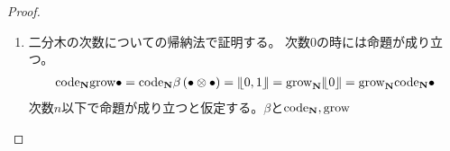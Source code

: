 {\begin{proof}
\begin{enumerate}
			次数$0$の時には命題が成り立つ。
			\begin{equation*}\begin{split}
				\code_\sizen\opN\bullet = \code_\sizen0 = 0 
				= \opN_\sizen\word{0} = \opN_\sizen\code_\sizen\bullet
			\end{split}\end{equation*}
			次数$n$以下で命題が成り立つと仮定する。$\beta$と$\code_\sizen,\opN$
			との交換関係から次の式が成り立つ。
			\begin{equation*}\begin{split}
				\code_\sizen\opN\beta 
				= m_0\plr{1\otimes\opR_+}\plr{\code_\sizen\otimes\code_\sizen}
					\plr{\opN\otimes1 + 1\otimes\opN + 1\otimes1} \\
			\end{split}\end{equation*}
			任意の$r,s\le n$に対して、$\clB_r\otimes\clB_s$に作用させると、
			帰納法の仮定から次の式が成り立ち、
			\begin{equation*}\begin{split}
				& \code_\sizen\opN\beta\plr{\clB_r\otimes\clB_s} \\
				&= m_0\plr{1\otimes\opR_+}\plr{\code_\sizen\otimes\code_\sizen}
					\plr{\opN\otimes1 + 1\otimes\opN + 1\otimes1}
					\plr{\clB_r\otimes\clB_s} \\
				&= m_0\plr{1\otimes\opR_+}
					\plr{\opN_\sizen\otimes1 + 1\otimes\opN_\sizen + 1\otimes1}
					\plr{\code_\sizen\otimes\code_\sizen}
					\plr{\clB_r\otimes\clB_s} \\
				&= m_0\plr{\opN_\sizen\otimes1 + 1\otimes\opN_\sizen}
					\plr{1\otimes\opR_+}
					\plr{\code_\sizen\otimes\code_\sizen}
					\plr{\clB_r\otimes\clB_s} \\
				&= \opN_\sizen\code_\sizen\beta\plr{\clB_r\otimes\clB_s} \\
			\end{split}\end{equation*}
			次数が$n+1$でも命題が成り立つことがわかる。
			\item 二分木の次数についての帰納法で証明する。
			次数$0$の時には命題が成り立つ。
			\begin{equation*}\begin{split}
				{\mathinner{\operatorname{code}}}_{\mathbf{N}}{\mathinner{\operatorname{grow}}}\bullet 
				= {\mathinner{\operatorname{code}}}_{\mathbf{N}}\beta\mathinner{({\bullet\otimes\bullet})} = {|\!\lfloor{0,1}\rfloor\!|}
				= {\mathinner{\operatorname{grow}}}_{\mathbf{N}}{|\!\lfloor{0}\rfloor\!|} = {\mathinner{\operatorname{grow}}}_{\mathbf{N}}{\mathinner{\operatorname{code}}}_{\mathbf{N}}\bullet
			\end{split}\end{equation*}
			次数$n$以下で命題が成り立つと仮定する。$\beta$と${\mathinner{\operatorname{code}}}_{\mathbf{N}},{\mathinner{\operatorname{grow}}}$

\end{enumerate}
\end{proof}}
